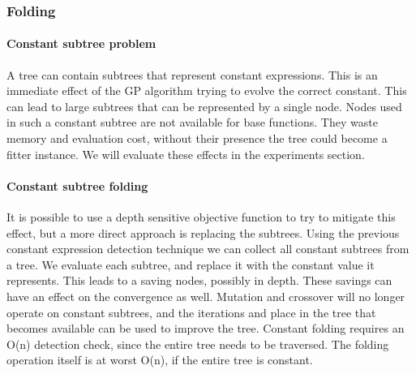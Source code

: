 \subsubsection{Folding}
\paragraph{Constant subtree problem}
A tree can contain subtrees that represent constant expressions. This is an immediate effect of the GP algorithm trying to evolve the correct constant. This can lead to large subtrees that can be represented by a single node. Nodes used in such a constant subtree are not available for base functions. They waste memory and evaluation cost, without their presence the tree could become a fitter instance. We will evaluate these effects in the experiments section.
\paragraph{Constant subtree folding}
It is possible to use a depth sensitive objective function to try to mitigate this effect, but a more direct approach is replacing the subtrees.
Using the previous constant expression detection technique we can collect all constant subtrees from a tree. We evaluate each subtree, and replace it with the constant value it represents. This leads to a saving nodes, possibly in depth. These savings can have an effect on the convergence as well. Mutation and crossover will no longer operate on constant subtrees, and the iterations and place in the tree that becomes available can be used to improve the tree.
Constant folding requires an O(n) detection check, since the entire tree needs to be traversed. The folding operation itself is at worst O(n), if the entire tree is constant.
